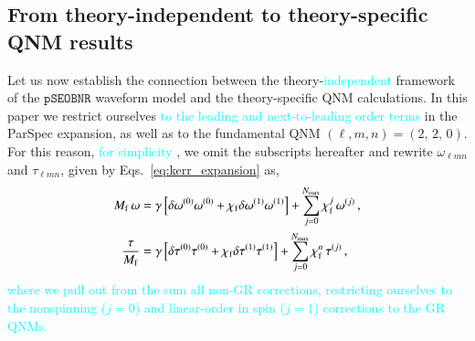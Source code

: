 \documentclass[twocolumn,
               prd,
               aps,
               superscriptaddress,
               tightenlines,
               nofootinbib,
               eqsecnum,
               amsfonts,
               amsmath,
               longbibliography]{revtex4-1}
\newcommand{\pSEOB}{\texttt{pSEOBNR}}
\newcommand{\ab}[1]{{\textcolor{cyan}{{#1}} }}
\begin{document}

\subsection{From theory-independent to theory-specific QNM results}
\label{sec:theory_specific_qnm}

Let us now establish the connection between the theory-\ab{independent} framework of the
$\pSEOB$ waveform model and the theory-specific QNM calculations. In this paper we restrict ourselves 
\ab{to the leading and next-to-leading order terms} in the ParSpec expansion, as well as to the fundamental QNM 
$(\ell, m, n) = (2,\, 2,\, 0)$. For this reason, \ab{for simplicity}, we omit the subscripts hereafter
and rewrite $\omega_{\ell m n}$ and $\tau_{\ell m n}$, given by Eqs.~\eqref{eq:kerr_expansion} as,
%
\begin{subequations}
\label{eq:qnm_nongr_iso}
\begin{align}
    M_{\rm f}\, \omega &= \gamma \left [ \delta\omega^{(0)} \omega^{(0)} + \chi_{\rm f} \delta\omega^{(1)} \omega^{(1)} \right ]
    + \sum_{j=0}^{N_{\rm max}} \chi^{j}_{\rm f}\, \omega^{(j)} \,,
\\
    \frac{\tau}{M_{\rm f}}   &= \gamma \left [ \delta\tau^{(0)} \tau^{(0)} + \chi_{\rm f} \delta\tau^{(1)} \tau^{(1)} \right ]
    + \sum_{j=0}^{N_{\rm max}} \chi^{n}_{\rm f}\, \tau^{(j)}\,,
\end{align}
\end{subequations}
%
\ab{where we pull out from the sum all non-GR corrections, restricting
ourselves to the nonspinning ($j=0$) and linear-order in spin ($j=1$)
corrections to the GR QNMs.}
%
\end{document}
